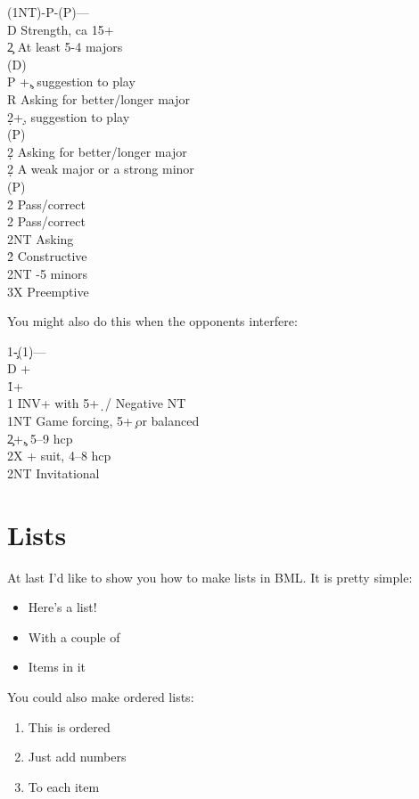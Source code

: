 \documentclass[a4paper]{article}
\begin{document}
\begin{bidtable}
(1NT)-P-(P)---\\
D \> Strength, ca 15+\\
2\c \> At least 5-4 majors\+\\
(D)\+\\
P +\c, suggestion to play\\
R \> Asking for better/longer major\\
2\d {}+\d, suggestion to play\-\\
(P)\+\\
2\d \> Asking for better/longer major\-\-\\
2\d \> A weak major or a strong minor\+\\
(P)\+\\
2\h \> Pass/correct\\
2\s \> Pass/correct\\
2NT \> Asking\-\-\\
2\h\s \> Constructive\\
2NT -5 minors\\
3X \> Preemptive
\end{bidtable}

You might also do this when the opponents interfere:

\begin{bidtable}
1\c-(1\d)---\\
D +\h\\
1\h {}+\s\\
1\s \> INV+ with 5+\d\ / Negative NT\\
1NT \> Game forcing, 5+\c\ or balanced\\
2\c {}+\c, 5--9 hcp\\
2X + suit, 4--8 hcp\\
2NT \> Invitational
\end{bidtable}

\section{Lists}

At last I'd like to show you how to make lists in BML. It is pretty
simple:

\begin{itemize}
\item Here's a list!

\item With a couple of

\item Items in it

\end{itemize}

You could also make ordered lists:

\begin{enumerate}
\item This is ordered

\item Just add numbers

\item To each item


\end{enumerate}
\end{document}
